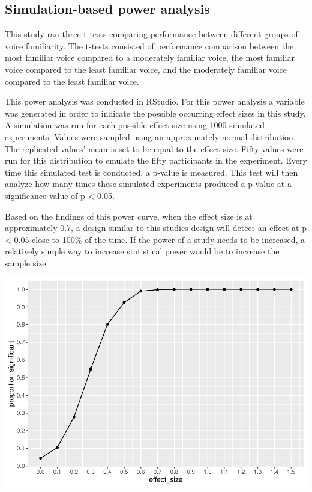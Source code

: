 \documentclass[
  english,
  man]{apa6}
\begin{document}
\hypertarget{simulation-based-power-analysis}{%
\subsection{Simulation-based power analysis}\label{simulation-based-power-analysis}}

This study ran three t-tests comparing performance between different groups of voice familiarity. The t-tests consisted of performance comparison between the most familiar voice compared to a moderately familiar voice, the most familiar voice compared to the least familiar voice, and the moderately familiar voice compared to the least familiar voice.

This power analysis was conducted in RStudio. For this power analysis a variable was generated in order to indicate the possible occurring effect sizes in this study. A simulation was run for each possible effect size using 1000 simulated experiments. Values were sampled using an approximately normal distribution. The replicated values' mean is set to be equal to the effect size. Fifty values were run for this distribution to emulate the fifty participants in the experiment. Every time this simulated test is conducted, a p-value is measured. This test will then analyze how many times these simulated experiments produced a p-value at a significance value of p \textless{} 0.05.

Based on the findings of this power curve, when the effect size is at approximately 0.7, a design similar to this studies design will detect an effect at p \textless{} 0.05 close to 100\% of the time. If the power of a study needs to be increased, a relatively simple way to increase statistical power would be to increase the sample size.

\includegraphics{APAreport_files/figure-latex/unnamed-chunk-6-1.pdf}
\end{document}
